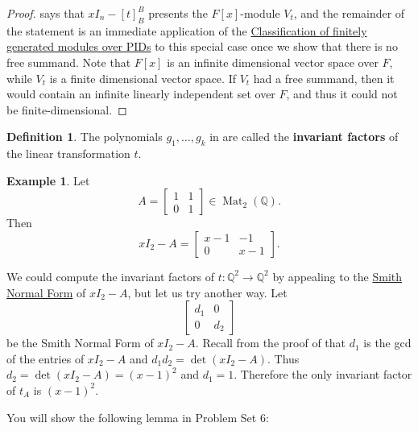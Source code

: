 \documentclass[12pt]{report}
\numberwithin{equation}{section}
\numberwithin{theorem}{chapter}
\theoremstyle{definition}
\newtheorem{definition}[theorem]{Definition}
\newtheorem{example}[theorem]{Example}
\newtheorem*{basic properties}{Basic Properties}
\newtheorem*{Important Remark}{Important Remark}
\newcommand{\df}[1]{{\bf #1}\index{#1}}
\newcommand{\Q}{\mathbb{Q}}
\DeclareMathOperator{\M}{Mat}
\begin{document}
\begin{proof}
 says that $xI_n-[t]_B^B$ presents the $F[x]$-module $V_t$, and the remainder of the statement is an immediate application of the \hyperref[classification elementary divisors]{Classification of finitely generated modules over PIDs} to this special case once we show that there is no free summand. Note that $F[x]$ is an infinite dimensional vector space over $F$, while $V_t$ is a finite dimensional vector space. If $V_t$ had a free summand, then it would contain an infinite linearly independent set over $F$, and thus it could not be finite-dimensional.
\end{proof}


\begin{definition}
The polynomials $g_1,\ldots,g_k$ in  are called the \df{invariant factors} of the linear transformation $t$.
\end{definition}


\begin{example}\label{ex:SNF}
Let 
$$A= \begin{bmatrix} 1 & 1 \\ 0 & 1  \end{bmatrix}\in \M_2(\Q).$$ 
Then 
$$xI_2-A= \begin{bmatrix} x-1 & -1 \\ 0 & x-1  \end{bmatrix}.$$

We could compute the invariant factors of $t\!:\Q^2\to\Q^2$ by appealing to the \hyperref[Smith Normal Form]{Smith Normal Form} of $xI_2-A$, but let us try another way. Let
$$\begin{bmatrix} d_1 & 0 \\ 0 & d_2 \end{bmatrix}$$
be the Smith Normal Form of $xI_2-A$. Recall from the proof of  that $d_1$ is the gcd of the entries of $xI_2-A$ and $d_1d_2=\det(xI_2-A)$. Thus $d_2=\det(xI_2-A)=(x-1)^2$ and $d_1=1$. Therefore the only invariant factor of $t_A$ is $(x-1)^2$.
\end{example}



You will show the following lemma in Problem Set 6:
\end{document}
